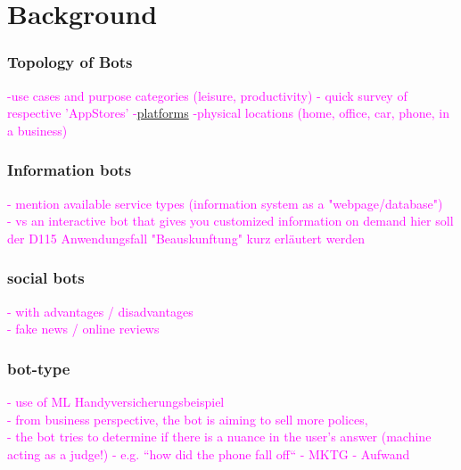 \chapter{Background}
\label{background}



\subsection{Topology of Bots}
\textcolor{magenta}{
	-use cases and purpose categories (leisure, productivity) - quick survey of respective 'AppStores'
	-\href{https://www.npr.org/podcasts/510308/hidden-brain}{platforms}
	-physical locations (home, office, car, phone, in a business)
}

\subsection{Information bots}
\textcolor{magenta}{
	- mention available service types (information system as a "webpage/database")\\
	- vs an interactive bot that gives you customized information on demand
	hier soll der D115 Anwendungsfall "Beauskunftung" kurz erl\"autert werden\\
}
\subsection{social bots}
\textcolor{magenta}{
	- with advantages / disadvantages\\
	- fake news / online reviews\\
}

\subsection{bot-type}
\textcolor{magenta}{
	- use of ML
	Handyversicherungsbeispiel\\
	- from business perspective, the bot is aiming to sell more polices,\\ 
	- the bot tries to determine if there is a nuance in the user's answer (machine acting as a judge!)
	- e.g. ``how did the phone fall off``
	- MKTG - Aufwand
}

